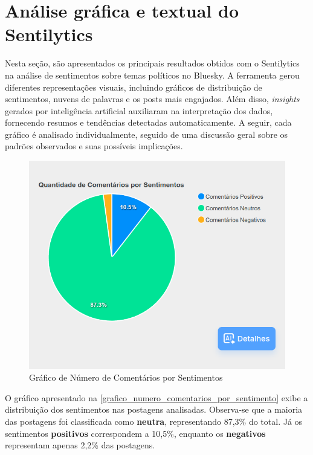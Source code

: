 \documentclass[
	12pt,				%
	oneside,			%
	a4paper,			%
	english,			%
	french,				%
	spanish,			%
	brazil				%
	]{abntex2}
\begin{document}
\hypertarget{anuxe1lise-gruxe1fica-e-textual-do-sentilytics}{%
\section{Análise gráfica e textual do
Sentilytics}\label{anuxe1lise-gruxe1fica-e-textual-do-sentilytics}}

Nesta seção, são apresentados os principais resultados obtidos com o
Sentilytics na análise de sentimentos sobre temas políticos no Bluesky.
A ferramenta gerou diferentes representações visuais, incluindo gráficos
de distribuição de sentimentos, nuvens de palavras e os posts mais
engajados. Além disso, \emph{insights} gerados por inteligência
artificial auxiliaram na interpretação dos dados, fornecendo resumos e
tendências detectadas automaticamente. A seguir, cada gráfico é
analisado individualmente, seguido de uma discussão geral sobre os
padrões observados e suas possíveis implicações.

\begin{figure}[htbp]
\hypertarget{grafico_numero_comentarios_por_sentimento}{%
\caption{Gráfico de Número de Comentários por Sentimentos}\label{grafico_numero_comentarios_por_sentimento}
\begin{center}
\includegraphics[scale=0.3]{imagens/sentilytics/estudo-caso/quantidade_comentarios_por_sentimentos.png}
\end{center}
}
\end{figure}

O gráfico apresentado na
\autoref{grafico_numero_comentarios_por_sentimento} exibe a distribuição
dos sentimentos nas postagens analisadas. Observa-se que a maioria das
postagens foi classificada como \textbf{neutra}, representando 87,3\% do
total. Já os sentimentos \textbf{positivos} correspondem a 10,5\%,
enquanto os \textbf{negativos} representam apenas 2,2\% das postagens.
\end{document}
